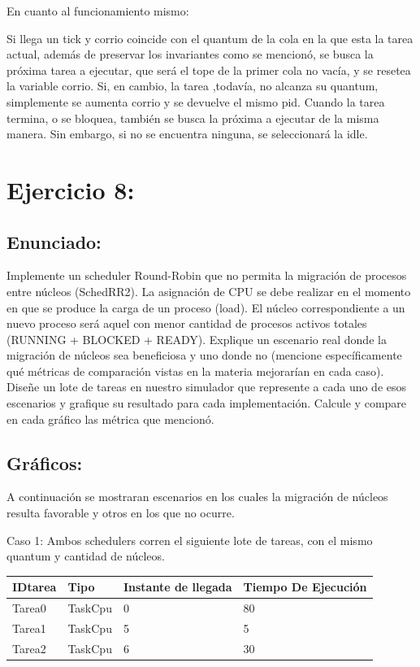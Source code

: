 \documentclass[10pt, a4paper]{article}
\begin{document}
En cuanto al funcionamiento mismo:

Si llega un tick y corrio coincide con el quantum de la cola en la que esta la tarea actual, además de preservar los invariantes como se mencionó, se busca la próxima tarea a ejecutar, que será el tope de la primer cola no vacía, y se resetea la variable corrio. Si, en cambio, la tarea ,todavía, no alcanza su quantum, simplemente se aumenta corrio y se  devuelve el mismo pid.
Cuando la tarea termina, o se bloquea, también se busca la próxima a ejecutar de la misma manera. Sin embargo, si no se encuentra ninguna, se seleccionará la idle.

\section{Ejercicio 8:}
	
\subsection{Enunciado:}
Implemente un scheduler Round-Robin que no permita la migración de procesos
entre núcleos (SchedRR2). La asignación de CPU se debe realizar en el momento en que se produce la carga de un proceso (load). El núcleo correspondiente a un nuevo proceso será aquel
con menor cantidad de procesos activos totales (RUNNING + BLOCKED + READY). Explique un escenario real donde la migración de núcleos sea beneficiosa y uno donde no (mencione
específicamente qué métricas de comparación vistas en la materia mejorarían en cada caso).
Diseñe un lote de tareas en nuestro simulador que represente a cada uno de esos escenarios y grafique su resultado para cada implementación. Calcule y compare en cada gráfico las
métrica que mencionó.


\subsection{Gráficos:}
A continuación se mostraran escenarios en los cuales la migración de núcleos resulta favorable y otros en los que no ocurre.

Caso 1: Ambos schedulers corren el siguiente lote de tareas, con el mismo quantum y cantidad de núcleos.

\begin{center}
\begin{tabular}{| l | l | l | l |}
    \hline
    IDtarea &  Tipo & Instante de llegada& Tiempo De Ejecución\\ \hline
    Tarea0 & 	TaskCpu & 0&80 \\ \hline
    Tarea1 &	TaskCpu & 5&5 \\ \hline
    Tarea2 &	TaskCpu & 6&30 \\ \hline
   
\end{tabular}
\end{center}
\end{document}

